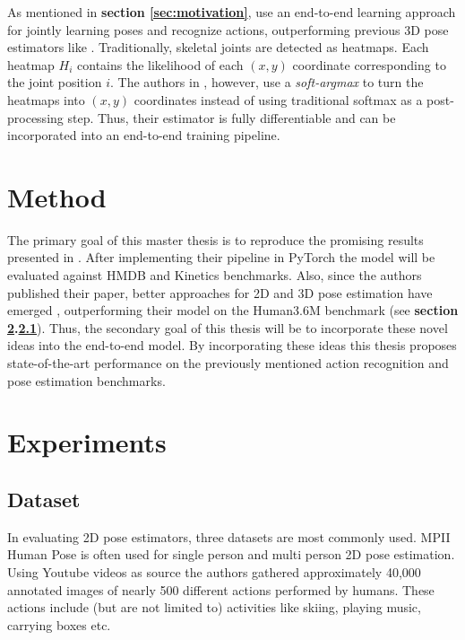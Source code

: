 \documentclass[twoside]{article}
\begin{document}
\begin{multicols}{2}
As mentioned in \textbf{section \ref{sec:motivation}}, \cite{luvizon_2d/3d_2018} use an end-to-end learning approach for jointly learning poses and recognize actions, outperforming previous 3D pose estimators like \cite{martinez_simple_2017}.
Traditionally, skeletal joints are detected as heatmaps.
Each heatmap $H_i$ contains the likelihood of each $(x,y)$ coordinate corresponding to the joint position $i$.
The authors in \cite{luvizon_2d/3d_2018}, however, use a \textit{soft-argmax}\cite{luvizon_human_2017} to turn the heatmaps into $(x,y)$ coordinates instead of using traditional softmax as a post-processing step.
Thus, their estimator is fully differentiable and can be incorporated into an end-to-end training pipeline.

\section{Method}

The primary goal of this master thesis is to reproduce the promising results presented in \cite{luvizon_2d/3d_2018}.
After implementing their pipeline in PyTorch \cite{paszke_automatic_2017} the model will be evaluated against HMDB \cite{kuehne_hmdb:_2011} and Kinetics \cite{kay_kinetics_2017} benchmarks.
Also, since the authors published their paper, better approaches for 2D and 3D pose estimation have emerged \cite{pavllo_3d_2019}, outperforming their model on the Human3.6M benchmark (see \textbf{section \ref{sec:experiment}.\ref{sec:dataset}}).
Thus, the secondary goal of this thesis will be to incorporate these novel ideas into the end-to-end model.
By incorporating these ideas this thesis proposes state-of-the-art performance on the previously mentioned action recognition and pose estimation benchmarks.

\section{Experiments}
\label{sec:experiment}
\subsection{Dataset}
\label{sec:dataset}

In evaluating 2D pose estimators, three datasets are most commonly used.
MPII Human Pose \cite{andriluka_2d_2014} is often used for single person and multi person 2D pose estimation.
Using Youtube videos as source the authors gathered approximately 40,000 annotated images of nearly 500 different actions performed by humans.
These actions include (but are not limited to) activities like skiing, playing music, carrying boxes etc.


\end{multicols}
\end{document}
